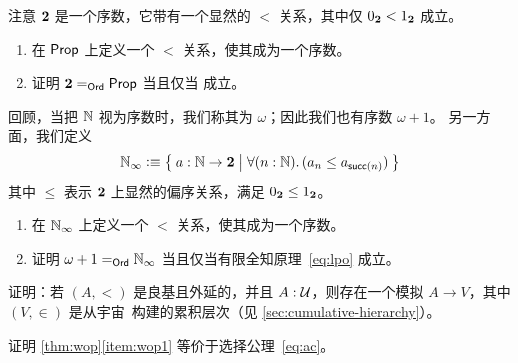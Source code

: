 \begin{ex}\label{ex:prop-ord}
  注意 $\bool$ 是一个序数，它带有一个显然的 $<$ 关系，其中仅 $\bfalse<\btrue$ 成立。
  \begin{enumerate}
  \item 在 $\prop$ 上定义一个 $<$ 关系，使其成为一个序数。
  \item 证明 $\id[\ord]\bool\prop$ 当且仅当 \LEM{} 成立。
  \end{enumerate}
\end{ex}

\begin{ex}\label{ex:ninf-ord}
  回顾，当把 $\nat$ 视为序数时，我们称其为 $\omega$；因此我们也有序数 $\omega+1$。
  另一方面，我们定义
  \[ \nat_\infty \defeq \setof{a:\nat\to\bool | \fall{n:\nat} (a_n \le a_{\suc(n)}) } \]
  其中 $\le$ 表示 $\bool$ 上显然的偏序关系，满足 $\bfalse\le\btrue$。
  \begin{enumerate}
  \item 在 $\nat_\infty$ 上定义一个 $<$ 关系，使其成为一个序数。
  \item 证明 $\id[\ord]{\omega+1}{\nat_\infty}$ 当且仅当有限全知原理~\eqref{eq:lpo} 成立。%
  \end{enumerate}
\end{ex}

\begin{ex}\label{ex:well-founded-extensional-simulation}
  证明：若 $(A,<)$ 是良基且外延的，并且 $A:\UU$，则存在一个模拟 $A\to V$，其中 $(V,\in)$ 是从宇宙~\UU 构建的累积层次（见 \cref{sec:cumulative-hierarchy}）。
\end{ex}

\begin{ex}\label{ex:choice-function}
  证明 \cref{thm:wop}\ref{item:wop1} 等价于选择公理~\eqref{eq:ac}。
\end{ex}

